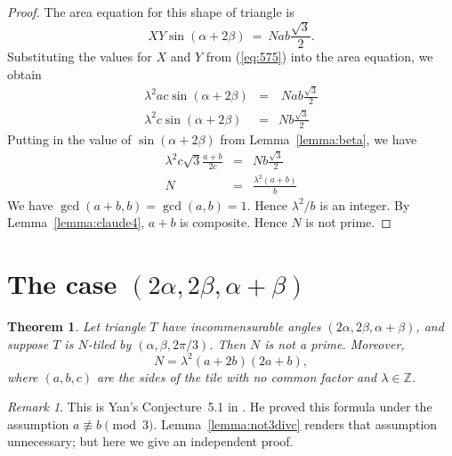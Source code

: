 \documentclass{amsart}
\theoremstyle{plain}
\newtheorem{theorem}{Theorem}
\theoremstyle{definition}
\theoremstyle{remark}
\newtheorem*{remark}{Remark}
\def\Z{{\mathbb Z}}
\begin{document}
\begin{proof}
The area equation for this shape of triangle is 
$$ XY \sin (\alpha+2 \beta) \ = \ N ab \frac {\sqrt 3} 2.$$
Substituting the values for $X$ and $Y$ from (\ref{eq:575}) into the area equation,
we obtain
\begin{eqnarray*}
\lambda^2 ac \sin(\alpha+2 \beta) &=& \ N ab \frac {\sqrt 3} 2  \\
\lambda^2 c \sin(\alpha+2\beta)  &=& Nb \frac {\sqrt 3} 2  
\end{eqnarray*}
Putting in the value of $\sin(\alpha+2\beta)$ from Lemma~\ref{lemma:beta}, we have
\begin{eqnarray*}
\lambda^2 c \sqrt 3 \frac {a+b}{2c}  &=& Nb\frac {\sqrt 3} 2  \\
N &=& \frac {\lambda^2 (a+b)} b
\end{eqnarray*}
We have $\gcd(a+b,b) = \gcd(a,b) = 1$.  Hence $\lambda^2/b$ is an integer. 
 By Lemma~\ref{lemma:claude4}, $a+b$ is composite.  
Hence $N$ is not prime.
\end{proof}


\section{The case $(2\alpha, 2\beta, \alpha+\beta)$}
\begin{theorem} \label{theorem:case5}  Let triangle $T$ have incommensurable angles 
$(2\alpha, 2\beta, \alpha + \beta)$, and suppose $T$ is $N$-tiled by $(\alpha,\beta,2\pi/3)$.
Then $N$ is not a prime.  Moreover,
$$N = \lambda^2 (a+2b) (2a+b),$$
where $(a,b,c)$ are the sides of the tile with no common factor and $\lambda \in \Z$. 
\end{theorem}

\begin{remark} This is Yan's Conjecture~5.1 in \cite{zhang2026}. He proved
this formula under the assumption $a \not\equiv b \pmod 3$.  Lemma~\ref{lemma:not3divc}
renders that assumption unnecessary; but here we give an independent proof. 
\end{remark}
\end{document}
